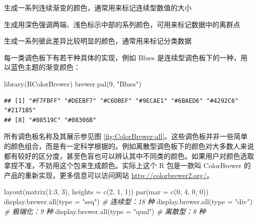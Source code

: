 \documentclass[
  b5paper,
  UTF8,twoside]{book}
\newenvironment{Shaded}{\begin{snugshade}}{\end{snugshade}}
\newcommand{\AttributeTok}[1]{\textcolor[rgb]{0.77,0.63,0.00}{#1}}
\newcommand{\CommentTok}[1]{\textcolor[rgb]{0.56,0.35,0.01}{\textit{#1}}}
\newcommand{\DecValTok}[1]{\textcolor[rgb]{0.00,0.00,0.81}{#1}}
\newcommand{\FunctionTok}[1]{\textcolor[rgb]{0.00,0.00,0.00}{#1}}
\newcommand{\NormalTok}[1]{#1}
\newcommand{\SpecialCharTok}[1]{\textcolor[rgb]{0.00,0.00,0.00}{#1}}
\newcommand{\StringTok}[1]{\textcolor[rgb]{0.31,0.60,0.02}{#1}}
\providecommand{\tightlist}{%
  \setlength{\itemsep}{0pt}\setlength{\parskip}{0pt}}
\begin{document}
\begin{description}
\tightlist
\item[连续型调色板 Sequential palettes]
生成一系列连续渐变的颜色，通常用来标记连续型数值的大小
\item[极端化调色板 Diverging palettes]
生成用深色强调两端、浅色标示中部的系列颜色，可用来标记数据中的离群点
\item[离散型调色板 Qualitative palettes]
生成一系列彼此差异比较明显的颜色，通常用来标记分类数据
\end{description}

每一类调色板下有若干种具体的实现，例如 Blues 是连续型调色板下的一种，用以蓝色主题的渐变颜色：

\begin{Shaded}
\begin{Highlighting}[]
\FunctionTok{library}\NormalTok{(RColorBrewer)}
\FunctionTok{brewer.pal}\NormalTok{(}\DecValTok{9}\NormalTok{, }\StringTok{"Blues"}\NormalTok{)}
\end{Highlighting}
\end{Shaded}

\begin{verbatim}
## [1] "#F7FBFF" "#DEEBF7" "#C6DBEF" "#9ECAE1" "#6BAED6" "#4292C6" "#2171B5"
## [8] "#08519C" "#08306B"
\end{verbatim}

所有调色板名称及其展示参见图 \ref{fig:ColorBrewer-all}。这些调色板并非一些简单的颜色组合，而是有一定科学根据的。例如离散型调色板下的颜色对大多数人来说都有较好的区分度，甚至色盲也可以辨认其中不同类的颜色。如果用户对颜色选取拿捏不准，不妨用这个包来生成颜色。实际上这个 R 包是一款叫 ColorBrewer 的产品的重新实现，更多信息可以访问网站 \url{http://colorbrewer2.org/}。

\begin{Shaded}
\begin{Highlighting}[]
\FunctionTok{layout}\NormalTok{(}\FunctionTok{matrix}\NormalTok{(}\DecValTok{1}\SpecialCharTok{:}\DecValTok{3}\NormalTok{, }\DecValTok{3}\NormalTok{), }\AttributeTok{heights =} \FunctionTok{c}\NormalTok{(}\DecValTok{2}\NormalTok{, }\DecValTok{1}\NormalTok{, }\DecValTok{1}\NormalTok{))}
\FunctionTok{par}\NormalTok{(}\AttributeTok{mar =} \FunctionTok{c}\NormalTok{(}\DecValTok{0}\NormalTok{, }\DecValTok{4}\NormalTok{, }\DecValTok{0}\NormalTok{, }\DecValTok{0}\NormalTok{))}
\FunctionTok{display.brewer.all}\NormalTok{(}\AttributeTok{type =} \StringTok{"seq"}\NormalTok{) }\CommentTok{\# 连续型：18 种}
\FunctionTok{display.brewer.all}\NormalTok{(}\AttributeTok{type =} \StringTok{"div"}\NormalTok{) }\CommentTok{\# 极端化：9 种}
\FunctionTok{display.brewer.all}\NormalTok{(}\AttributeTok{type =} \StringTok{"qual"}\NormalTok{) }\CommentTok{\# 离散型：8 种}
\end{Highlighting}
\end{Shaded}
\end{document}
